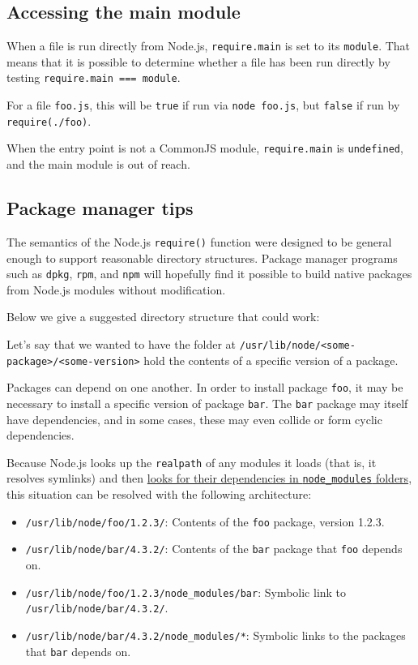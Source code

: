 \subsection{Accessing the main module}\label{accessing-the-main-module}

When a file is run directly from Node.js, \texttt{require.main} is set
to its \texttt{module}. That means that it is possible to determine
whether a file has been run directly by testing
\texttt{require.main\ ===\ module}.

For a file \texttt{foo.js}, this will be \texttt{true} if run via
\texttt{node\ foo.js}, but \texttt{false} if run by
\texttt{require(\textquotesingle{}./foo\textquotesingle{})}.

When the entry point is not a CommonJS module, \texttt{require.main} is
\texttt{undefined}, and the main module is out of reach.

\subsection{Package manager tips}\label{package-manager-tips}

The semantics of the Node.js \texttt{require()} function were designed
to be general enough to support reasonable directory structures. Package
manager programs such as \texttt{dpkg}, \texttt{rpm}, and \texttt{npm}
will hopefully find it possible to build native packages from Node.js
modules without modification.

Below we give a suggested directory structure that could work:

Let's say that we wanted to have the folder at
\texttt{/usr/lib/node/\textless{}some-package\textgreater{}/\textless{}some-version\textgreater{}}
hold the contents of a specific version of a package.

Packages can depend on one another. In order to install package
\texttt{foo}, it may be necessary to install a specific version of
package \texttt{bar}. The \texttt{bar} package may itself have
dependencies, and in some cases, these may even collide or form cyclic
dependencies.

Because Node.js looks up the \texttt{realpath} of any modules it loads
(that is, it resolves symlinks) and then
\hyperref[loading-from-node_modules-folders]{looks for their
dependencies in \texttt{node\_modules} folders}, this situation can be
resolved with the following architecture:

\begin{itemize}
\tightlist
\item
  \texttt{/usr/lib/node/foo/1.2.3/}: Contents of the \texttt{foo}
  package, version 1.2.3.
\item
  \texttt{/usr/lib/node/bar/4.3.2/}: Contents of the \texttt{bar}
  package that \texttt{foo} depends on.
\item
  \texttt{/usr/lib/node/foo/1.2.3/node\_modules/bar}: Symbolic link to
  \texttt{/usr/lib/node/bar/4.3.2/}.
\item
  \texttt{/usr/lib/node/bar/4.3.2/node\_modules/*}: Symbolic links to
  the packages that \texttt{bar} depends on.
\end{itemize}


